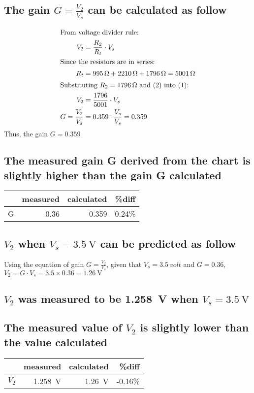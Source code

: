 \documentclass{article}
\begin{document}
\subsection{The gain $G=\frac{V_2}{V_s}$ can be calculated as follow}
\begin{align}
    \intertext{From voltage divider rule:}
    V_2 &= \frac{R_2}{R_t} \cdot V_s\\
    \intertext{Since the resistors are in series:}
    R_t &= \SI{995}{\ohm} + \SI{2210}{\ohm} + \SI{1796}{\ohm} =\SI{5001}{\ohm}\\
    \intertext{Substituting $R_2 = \SI{1796}{\ohm}$ and (2) into (1):}
    V_2 &= \frac{1796}{5001} \cdot V_s\\
    G = \frac{V_2}{V_s} &= 0.359 \cdot \frac{V_s}{V_s} = 0.359
\end{align}
Thus, the gain $G = 0.359$

\subsection{The measured gain G derived from the chart is slightly higher than the gain G calculated}
\begin{table}[H]
\centering
    \begin{tabular}{@{} l r r r@{}}
         \toprule
         &measured & calculated & \%diff  \\
         \midrule
         G & 0.36 & 0.359 & 0.24\% \\
         \bottomrule
    \end{tabular}
\end{table}

\subsection{$V_2$ when $V_s = \SI{3.5}{\volt}$ can be predicted as follow}
Using the equation of gain $G=\frac{V_2}{V_s}$, given that $V_s = \SI{3.5}{volt}$ and $G = 0.36$, $V_2 = G\cdot V_s = 3.5 \times 0.36 = \SI{1.26}{\volt}$

\subsection{$V_2$ was measured to be \SI{1.258}{\volt} when $V_s = \SI{3.5}{\volt}$}

\subsection{The measured value of $V_2$ is slightly lower than the value calculated}
\begin{table}[H]
\centering
    \begin{tabular}{@{} l r r r@{}}
         \toprule
         &measured & calculated & \%diff  \\
         \midrule
         $V_2$ &\SI{1.258}{\volt} & \SI{1.26}{\volt} & -0.16\% \\
         \bottomrule
    \end{tabular}
\end{table}
\end{document}
